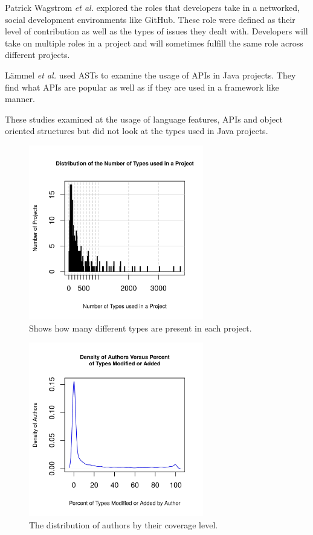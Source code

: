 \documentclass{sig-alternate-05-2015}
\begin{document}
Patrick Wagstrom \textit{et al.} \cite{Patrick:Wagstrom:2012} explored the roles that developers take in a networked, social development environments like GitHub. These role were defined as their level of contribution as well as the types of issues they dealt with. Developers will take on multiple roles in a project and will sometimes fulfill the same role across different projects.

L\"{a}mmel \textit{et al.} \cite{Lammel:2011:LAA:1982185.1982471} used ASTs to examine the usage of APIs in Java projects. They find what APIs are popular as well as if they are used in a framework like manner. 

These studies examined at the usage of language features, APIs and object oriented structures but did not look at the types used in Java projects.

\begin{figure}[t]
\centering
\includegraphics[height=3in, width=3in]{../lib_stats_number_of_libraries_dist}
\caption{Shows how many different types are present in each project.}
\label{lib_stats_number_of_libraries_dist}
\end{figure}

\begin{figure}[t]
\centering
\includegraphics[height=3in, width=3in]{../lib_stats_dist}
\caption{The distribution of authors by their coverage level.}
\label{lib_stats_dist}
\end{figure}
\end{document}
